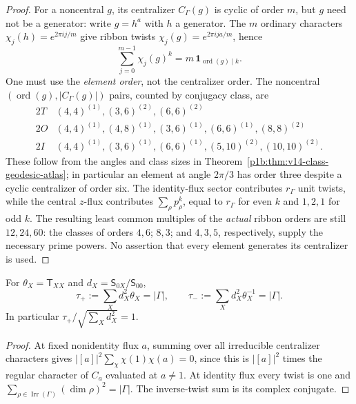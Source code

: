 \documentclass[11pt]{article}
\begin{document}
\begin{proof}
For a noncentral $g$, its centralizer $C_\Gamma(g)$ is cyclic of
order $m$, but $g$ need not be a generator: write $g=h^a$ with $h$
a generator.  The $m$ ordinary characters $\chi_j(h)=e^{2\pi i j/m}$
give ribbon twists $\chi_j(g)=e^{2\pi i ja/m}$, hence
\[
  \sum_{j=0}^{m-1}\chi_j(g)^k
   =m\,\mathbf1_{\operatorname{ord}(g)\mid k}.
\]
One must use the \emph{element order}, not the centralizer order.
The noncentral $(\operatorname{ord}(g),|C_\Gamma(g)|)$ pairs,
counted by conjugacy class, are
\[
\begin{array}{c|l}
2T&(4,4)^{(1)},(3,6)^{(2)},(6,6)^{(2)}\\
2O&(4,4)^{(1)},(4,8)^{(1)},(3,6)^{(1)},
    (6,6)^{(1)},(8,8)^{(2)}\\
2I&(4,4)^{(1)},(3,6)^{(1)},(6,6)^{(1)},
    (5,10)^{(2)},(10,10)^{(2)}.
\end{array}
\]
These follow from the angles and class sizes in
Theorem~\ref{p1b:thm:v14-class-geodesic-atlas}; in particular an
element at angle $2\pi/3$ has order three despite a cyclic
centralizer of order six. The identity-flux sector contributes
$r_\Gamma$ unit twists, while the central $z$-flux contributes
$\sum_\rho p_\rho^k$, equal to $r_\Gamma$ for even $k$ and
$1,2,1$ for odd $k$.  The resulting least common multiples of the
\emph{actual} ribbon orders are still $12,24,60$: the classes of
orders $4,6$; $8,3$; and $4,3,5$, respectively, supply the necessary
prime powers. No assertion that every element generates its
centralizer is used.
\end{proof}

\begin{corollary}
\label{p1b:cor:v15-gauss-sum}
For $\theta_X=\mathsf T_{XX}$ and $d_X=\mathsf S_{0X}/\mathsf S_{00}$,
\[
\boxed{\tau_+:=\sum_Xd_X^2\theta_X=|\Gamma|,
\qquad \tau_-:=\sum_Xd_X^2\theta_X^{-1}=|\Gamma|.}
\tag{T15.10}\label{p1b:eq:v15-gauss}
\]
In particular $\tau_+/\sqrt{\sum_Xd_X^2}=1$.
\end{corollary}
\begin{proof}
At fixed nonidentity flux $a$, summing over all irreducible
centralizer characters gives
$|[a]|^2\sum_\chi\chi(1)\chi(a)=0$, since this is
$|[a]|^2$ times the regular character of $C_a$ evaluated at
$a\ne1$.  At identity flux every twist is one and
$\sum_{\rho\in\operatorname{Irr}(\Gamma)}(\dim\rho)^2
=|\Gamma|$. The inverse-twist sum is its complex conjugate.
\end{proof}
\end{document}
